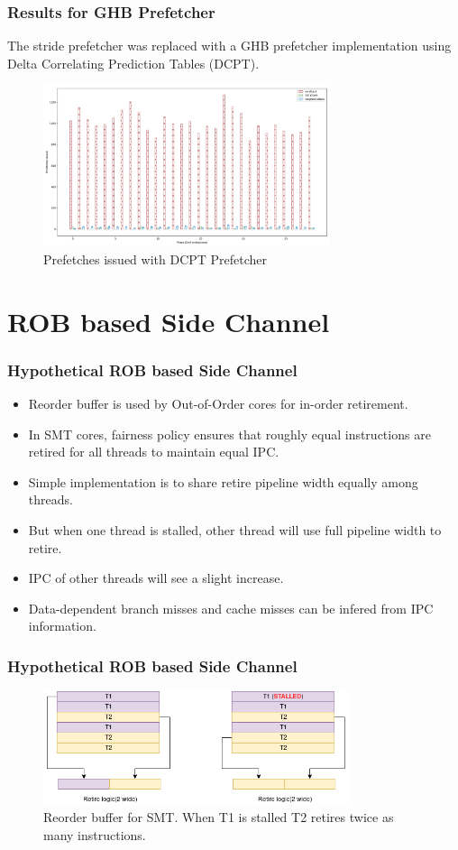 \documentclass[10pt]{beamer}
\begin{document}
\begin{frame}
\frametitle{Results for GHB Prefetcher}
The stride prefetcher was replaced with a GHB prefetcher implementation
using Delta Correlating Prediction Tables (DCPT).
\begin{figure}[ht]
    \centering
    \includegraphics[width=0.75\textwidth]{figures/dcpt-hwpf.png}
    \caption{Prefetches issued with DCPT Prefetcher}
\end{figure}
\end{frame}

\section{ROB based Side Channel}
\begin{frame}
\frametitle{Hypothetical ROB based Side Channel}
\begin{itemize}
    \item Reorder buffer is used by Out-of-Order cores for in-order retirement.
    \item In SMT cores, fairness policy ensures that roughly equal instructions are retired for all threads to maintain equal IPC.
    \item Simple implementation is to share retire pipeline width equally among threads.
    \item But when one thread is stalled, other thread will use full pipeline width to retire.
    \item IPC of other threads will see a slight increase.
    \item Data-dependent branch misses and cache misses can be infered from IPC information.
\end{itemize}
\end{frame}

\begin{frame}
\frametitle{Hypothetical ROB based Side Channel}
\begin{figure}
\centering
\includegraphics[width=0.8\textwidth]{figures/rob_side_channel}
\caption{Reorder buffer for SMT. When T1 is stalled T2 retires twice as many instructions.}
\end{figure}
\end{frame}
\end{document}
